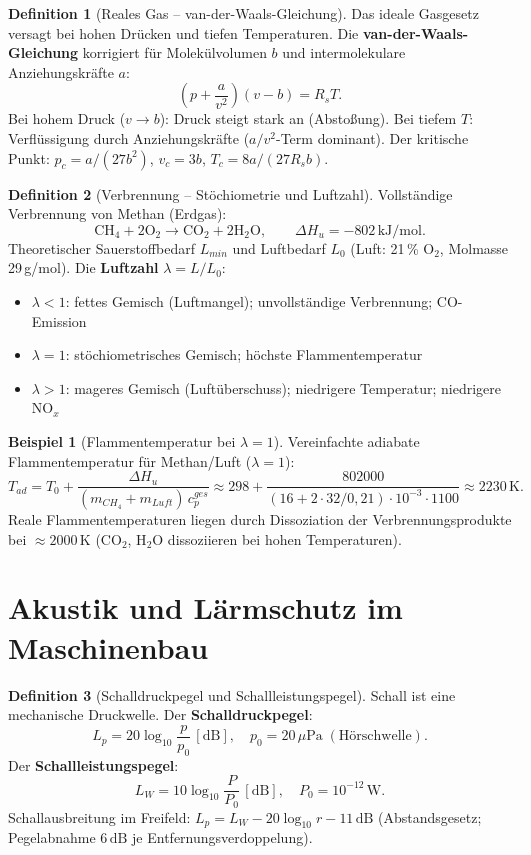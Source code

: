 ﻿\documentclass[a4paper,12pt]{report}
\theoremstyle{definition}
\newtheorem{definition}{Definition}
\newtheorem{beispiel}{Beispiel}
\begin{document}
\begin{definition}[Reales Gas -- van-der-Waals-Gleichung]
Das ideale Gasgesetz versagt bei hohen Drücken und tiefen Temperaturen.
Die \textbf{van-der-Waals-Gleichung} korrigiert für Molekülvolumen $b$
und intermolekulare Anziehungskräfte $a$:
\[
  \left(p + \frac{a}{v^2}\right)(v - b) = R_s T.
\]
Bei hohem Druck ($v \to b$): Druck steigt stark an (Abstoßung).
Bei tiefem $T$: Verflüssigung durch Anziehungskräfte ($a/v^2$-Term dominant).
Der kritische Punkt: $p_c = a/(27b^2)$, $v_c = 3b$, $T_c = 8a/(27R_s b)$.
\end{definition}

\begin{definition}[Verbrennung -- Stöchiometrie und Luftzahl]
Vollständige Verbrennung von Methan (Erdgas):
\[
  \mathrm{CH_4 + 2O_2 \to CO_2 + 2H_2O}, \qquad
  \Delta H_u = -802\,\mathrm{kJ/mol}.
\]
Theoretischer Sauerstoffbedarf $L_{min}$ und Luftbedarf $L_{0}$
(Luft: 21\,\% O$_2$, Molmasse 29\,g/mol).
Die \textbf{Luftzahl} $\lambda = L/L_{0}$:
\begin{itemize}
    \item[-] $\lambda < 1$: fettes Gemisch (Luftmangel); unvollständige Verbrennung; CO-Emission
    \item[-] $\lambda = 1$: stöchiometrisches Gemisch; höchste Flammentemperatur
    \item[-] $\lambda > 1$: mageres Gemisch (Luftüberschuss); niedrigere Temperatur; niedrigere NO$_x$
\end{itemize}
\end{definition}

\begin{beispiel}[Flammentemperatur bei $\lambda = 1$]
Vereinfachte adiabate Flammentemperatur für Methan/Luft ($\lambda = 1$):
\[
  T_{ad} = T_0 + \frac{\Delta H_u}{(m_{CH_4} + m_{Luft})\,c_p^{ges}}
  \approx 298 + \frac{802000}{(16 + 2\cdot32/0{,}21)\cdot10^{-3}\cdot1100}
  \approx 2230\,\mathrm{K}.
\]
Reale Flammentemperaturen liegen durch Dissoziation der Verbrennungsprodukte
bei $\approx 2000\,\mathrm{K}$ (CO$_2$, H$_2$O dissoziieren bei hohen Temperaturen).
\end{beispiel}

\section{Akustik und Lärmschutz im Maschinenbau}

\begin{definition}[Schalldruckpegel und Schallleistungspegel]
Schall ist eine mechanische Druckwelle. Der \textbf{Schalldruckpegel}:
\[
  L_p = 20\log_{10}\frac{p}{p_0}\,[\mathrm{dB}], \quad p_0 = 20\,\mu\mathrm{Pa}
  \;(\text{Hörschwelle}).
\]
Der \textbf{Schallleistungspegel}:
\[
  L_W = 10\log_{10}\frac{P}{P_0}\,[\mathrm{dB}], \quad P_0 = 10^{-12}\,\mathrm{W}.
\]
Schallausbreitung im Freifeld: $L_p = L_W - 20\log_{10}r - 11\,\mathrm{dB}$
(Abstandsgesetz; Pegelabnahme $6\,\mathrm{dB}$ je Entfernungsverdoppelung).
\end{definition}
\end{document}
